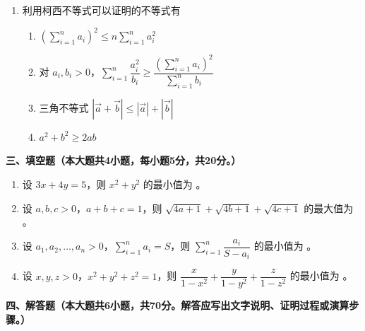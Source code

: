 \documentclass[12pt, a4paper]{ctexart}
\newcommand{\score}[1]{\hfill\makebox[2cm][l]{(#1分)}}
\begin{document}
\begin{enumerate}[resume]
\item 利用柯西不等式可以证明的不等式有\score{5}
\begin{enumerate}[label=\Alph*.]
\item $\left(\displaystyle\sum_{i=1}^{n} a_i\right)^2 \leqslant n \displaystyle\sum_{i=1}^{n} a_i^2$
\item 对 $a_i, b_i > 0$，$\displaystyle\sum_{i=1}^{n} \dfrac{a_i^2}{b_i} \geqslant \dfrac{\left(\displaystyle\sum_{i=1}^{n} a_i\right)^2}{\displaystyle\sum_{i=1}^{n} b_i}$
\item 三角不等式 $|\vec{a} + \vec{b}| \leqslant |\vec{a}| + |\vec{b}|$
\item $a^2 + b^2 \geqslant 2ab$
\end{enumerate}

\end{enumerate}

\vspace{0.5cm}

\noindent\textbf{三、填空题（本大题共4小题，每小题5分，共20分。）}

\vspace{0.3cm}

\begin{enumerate}[resume]
\item 设 $3x + 4y = 5$，则 $x^2 + y^2$ 的最小值为 \underline{\hspace{2cm}}。\score{5}

\item 设 $a, b, c > 0$，$a + b + c = 1$，则 $\sqrt{4a+1} + \sqrt{4b+1} + \sqrt{4c+1}$ 的最大值为 \underline{\hspace{2cm}}。\score{5}

\item 设 $a_1, a_2, \ldots, a_n > 0$，$\displaystyle\sum_{i=1}^{n} a_i = S$，则 $\displaystyle\sum_{i=1}^{n} \dfrac{a_i}{S - a_i}$ 的最小值为 \underline{\hspace{2cm}}。\score{5}

\item 设 $x, y, z > 0$，$x^2 + y^2 + z^2 = 1$，则 $\dfrac{x}{1-x^2} + \dfrac{y}{1-y^2} + \dfrac{z}{1-z^2}$ 的最小值为 \underline{\hspace{2cm}}。\score{5}

\end{enumerate}

\vspace{0.5cm}

\noindent\textbf{四、解答题（本大题共6小题，共70分。解答应写出文字说明、证明过程或演算步骤。）}
\end{document}

